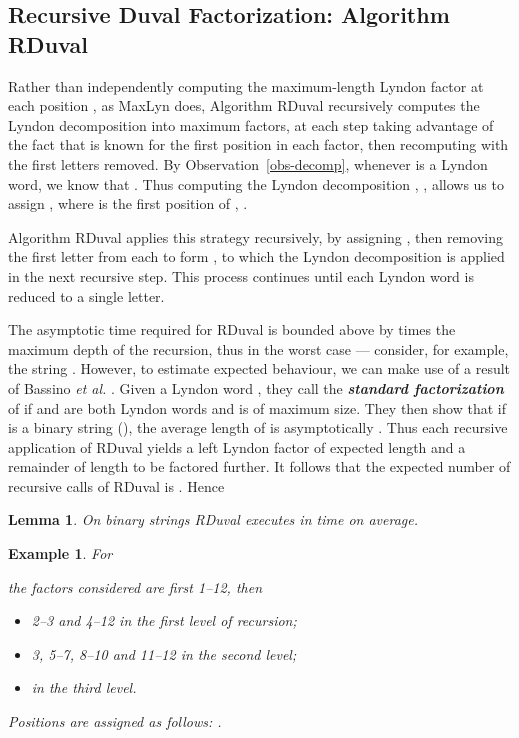 \documentclass[10pt]{llncs}
\newtheorem{lemm}[thrm]{Lemma}
\newtheorem{examp}[thrm]{Example}
\def\s#1{\mbox{\boldmath }}
\def\itbf#1{\textit{\textbf{#1}}}
\begin{document}
\subsection{Recursive Duval Factorization: Algorithm RDuval}
Rather than independently computing the maximum-length Lyndon factor
at each position , as MaxLyn does, Algorithm RDuval
recursively computes the Lyndon decomposition into
maximum factors, at each step taking advantage of the fact that
 is known for the first position  in each factor,
then recomputing with the first letters removed.
By Observation~\ref{obs-decomp},
whenever  is a Lyndon word,
we know that .
Thus computing the Lyndon decomposition ,
,
allows us to assign ,
where  is the first position of \s{w_j}, .

Algorithm RDuval applies this strategy recursively,
by assigning ,
then removing the first letter  from each  to form ,
to which the Lyndon decomposition is applied in the next recursive step.
This process continues until each Lyndon word is reduced to a single letter.

The asymptotic time required for RDuval is bounded above by
 times the maximum depth of the recursion, thus  in the worst case --- 
consider, for example, the string .
However, to estimate expected behaviour, we can make use of a result
of Bassino {\it et al.} \cite{BassinoCN05}.
Given a Lyndon word \s{w}, they call 
the \itbf{standard factorization} of \s{w} if \s{u} and \s{v}
are both Lyndon words and \s{v} is of maximum size.
They then show that if \s{w} is a binary string (),
the average length of \s{v} is asymptotically .
Thus each recursive application of RDuval yields a left Lyndon factor
of expected length 
and a remainder of length  to be factored further.
It follows that the expected number of recursive calls
of RDuval is .  Hence
\begin{lemm}
\label{lemm-RD}
On binary strings
RDuval executes in  time on average.
\end{lemm}
\begin{examp}
For

the factors considered are first 1--12, then
\begin{itemize}
\item[]
2--3 and 4--12 in the  first level of recursion;
\item[]
3, 5--7, 8--10 and 11--12 in the second level;
\item[]
 in the third level.
\end{itemize}
Positions are assigned as follows:
.
\end{examp}
\end{document}
